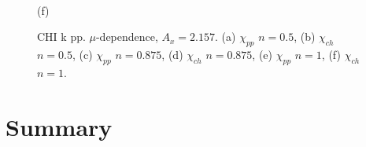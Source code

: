 \begin{figure}[h!]
\begin{minipage}[h]{0.5\linewidth}
 \\(f)
\end{minipage}
\caption{CHI k pp. $\mu$-dependence, $A_x=2.157$. (a) $\chi_{pp}$ $n=0.5$, (b) $\chi_{ch}$ $n=0.5$, (c) $\chi_{pp}$ $n=0.875$, (d) $\chi_{ch}$ $n=0.875$, (e) $\chi_{pp}$ $n=1$, (f) $\chi_{ch}$ $n=1$.}
\label{fig:CHI_k_pp_mu}
\end{figure}






\FloatBarrier
\section{Summary}














\FloatBarrier